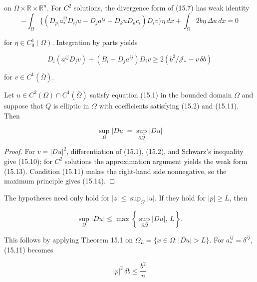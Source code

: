on \(\Omega\times\mathbb R\times\mathbb R^n\). For \(C^2\) solutions, the
divergence form of (15.7) has weak identity
\begin{equation}
\tag{15.12}
-\int_\Omega \bigl\{(D_{p_i}a_*^{ij}D_{ij}u-D_ja^{ij}+D_kuD_kc_i)D_iv\bigr\}\eta\,dx
+\int_\Omega 2b\eta\,\Delta u\,dx=0
\end{equation}



for \(\eta\in C_0^1(\Omega)\). Integration by parts yields

\begin{equation}
\tag{15.13}
D_i(a^{ij}D_j v)+(B_i-D_ja^{ij})D_iv \ge 2(b^2/\mathcal{J}_* - v\,\delta b)
\end{equation}

for \(v\in C^1(\bar\Omega)\).

\medskip

\begin{theorem}\label{gilbarg-trudinger.thm.15.1.gradient-maximum-principle}
Let $u \in C^2(\Omega) \cap C^1(\bar{\Omega})$ satisfy equation (15.1) in the bounded
domain $\Omega$ and suppose that $Q$ is elliptic in $\Omega$ with coefficients satisfying (15.2) and
(15.11). Then

\begin{equation}
\tag{15.14}
\sup_{\Omega} |Du| = \sup_{\partial\Omega} |Du|
\end{equation}
\end{theorem}
\begin{proof}
\sketch For $v=|Du|^2$, differentiation of (15.1), (15.2), and Schwarz's inequality give
(15.10); for $C^2$ solutions the approximation argument yields the weak form (15.13).
Condition (15.11) makes the right-hand side nonnegative, so the maximum principle gives (15.14).
\end{proof}

The hypotheses need only hold for \(|z|\leq\sup_\Omega|u|\). If they hold for
\(|p|\ge L\), then

\begin{equation}
\tag{15.15}
\sup_{\Omega} |Du| \leq \max \left\{ \sup_{\partial\Omega} |Du|,\, L \right\}.
\end{equation}

This follows by applying Theorem 15.1 on \(\Omega_L=\{x\in\Omega:|Du|>L\}\).
For \(a_*^{ij}=\delta^{ij}\), (15.11) becomes

\begin{equation}
\tag{15.16}
|p|^2\,\delta b \leq \frac{b^2}{n}
\end{equation}

